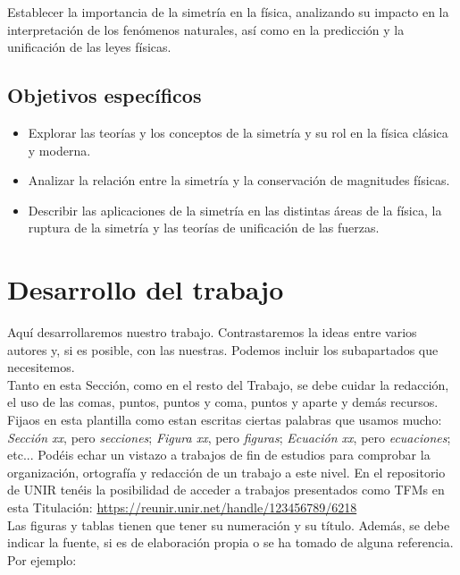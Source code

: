 \documentclass[11pt,a4paper,spanish]{book}
\begin{document}
Establecer la importancia de la simetría en la física, analizando su impacto en la interpretación de los fenómenos naturales, así como en la predicción y la unificación de las leyes físicas.


\section{Objetivos específicos}
\begin{itemize}
\item Explorar las teorías y los conceptos de la simetría y su rol en la física clásica y moderna.
\item Analizar la relación entre la simetría y la conservación de magnitudes físicas.
\item Describir las aplicaciones de la simetría en las distintas áreas de la física, la ruptura de la simetría y las teorías de unificación de las fuerzas.
\end{itemize}    

\chapter{Desarrollo del trabajo}

Aquí desarrollaremos nuestro trabajo. Contrastaremos la ideas entre varios autores y, si es posible, con las nuestras. Podemos incluir los subapartados que necesitemos.\\

Tanto en esta Sección, como en el resto del Trabajo, se debe cuidar la redacción, el uso de las comas, puntos, puntos y coma, puntos y aparte y demás recursos. Fijaos en esta plantilla como estan escritas ciertas palabras que usamos mucho: \emph{Sección xx}, pero \emph{secciones}; \emph{Figura xx}, pero \emph{figuras}; \emph{Ecuación xx}, pero \emph{ecuaciones}; etc... Podéis echar un vistazo a trabajos de fin de estudios para comprobar la organización, ortografía y redacción de un trabajo a este nivel. En el repositorio de UNIR tenéis la posibilidad de acceder a trabajos presentados como TFMs en esta Titulación: \url{https://reunir.unir.net/handle/123456789/6218}\\

Las figuras y tablas tienen que tener su numeración y su título. Además, se debe indicar la fuente, si es de elaboración propia o se ha tomado de alguna referencia.\\

Por ejemplo:
\end{document}
